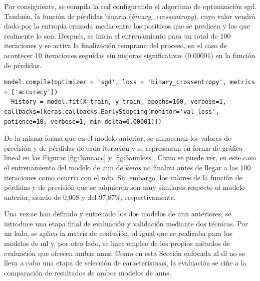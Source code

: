 \vspace{3mm}

Por consiguiente, se compila la red configurando el algoritmo de optimización \gls{sgd}. También, la función de pérdidas binaria (\textit{binary\_crossentropy}), cuyo valor vendrá dado por la entropía cruzada media entre los positivos que se predicen y los que realmente lo son. Después, se inicia el entrenamiento para un total de 100 iteraciones y se activa la finalización temprana del proceso, en el caso de acontecer 10 iteraciones seguidas sin mejoras significativas (0.00001) en la función de pérdidas. \cite{early}

\vspace{3mm}

\begin{lstlisting}[style=Python, caption={Entrenamiento del modelo de ANN de Keras}]
  model.compile(optimizer = 'sgd', loss = 'binary_crossentropy', metrics = ['accuracy'])
  History = model.fit(X_train, y_train, epochs=100, verbose=1, callbacks=[keras.callbacks.EarlyStopping(monitor='val_loss', patience=10, verbose=1, min_delta=0.00001)])
\end{lstlisting}

\vspace{3mm}

De la misma forma que en el modelo anterior, se almacenan los valores de precisión y de pérdidas de cada iteración y se representan en forma de gráfica lineal en las Figuras \ref{fig:3annacc} y \ref{fig:3annloss}. Como se puede ver, en este caso el entrenamiento del modelo de \gls{ann} de \textit{keras} no finaliza antes de llegar a las 100 iteraciones como ocurría con el \gls{mlp}. Sin embargo, los valores de la función de pérdidas y de precisión que se adquieren son muy similares respecto al modelo anterior, siendo de 0,068 y del 97,87\%, respectivamente. 

\vspace{3mm}

Una vez se han definido y entrenado los dos modelos de \gls{ann} anteriores, se introduce una etapa final de evaluación y validación mediante dos técnicas. Por un lado, se aplica la matriz de confusión, al igual que se realizaba para los modelos de \gls{ml} y, por otro lado, se hace empleo de los propios métodos de evaluación que ofrecen ambas \gls{ann}s. Como en esta Sección enfocada al \gls{dl} no se lleva a cabo una etapa de selección de características, la evaluación se ciñe a la comparación de resultados de ambos modelos de \gls{ann}s. 

